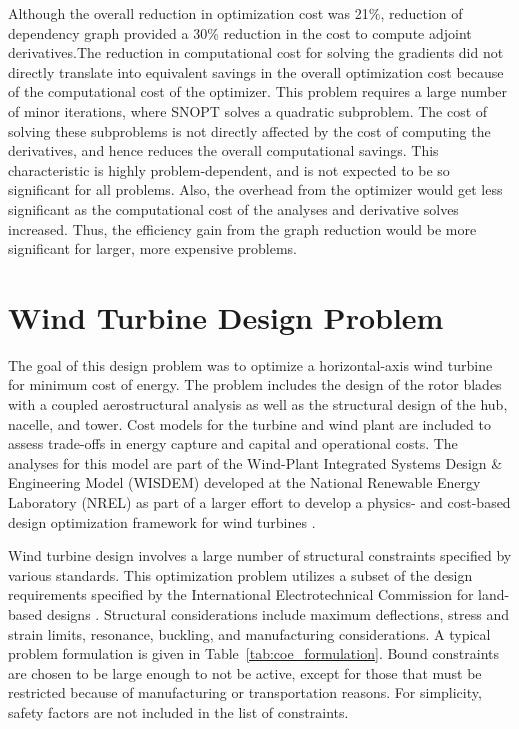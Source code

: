 \documentclass[]{aiaa-tc} %
\begin{document}
            Although the overall reduction in optimization cost was 21\%, reduction of dependency graph provided
            a 30\% reduction in the cost to compute adjoint derivatives.The reduction in computational cost for solving the gradients 
            did not directly translate into equivalent savings in the overall optimization cost because of the computational 
            cost of the optimizer. This problem requires a large number of minor iterations, where SNOPT solves a quadratic subproblem.
            The cost of solving these subproblems is not directly affected by the cost of computing the derivatives, and hence
            reduces the overall computational savings. This characteristic is highly problem-dependent, and is not expected
            to be so significant for all problems. Also, the overhead from the optimizer would get less significant as the
            computational cost of the analyses and derivative solves increased. Thus, the efficiency gain from the graph reduction
            would be more significant for larger, more expensive problems.


  \section{Wind Turbine Design Problem}

    The goal of this design problem was to optimize a horizontal-axis wind turbine for minimum
    cost of energy. The problem includes the design of the rotor blades
    with a coupled aerostructural analysis as well as the structural design of the hub, nacelle,
    and tower. Cost models for the turbine and wind plant are included
    to assess trade-offs in energy capture and capital and operational costs. The analyses
    for this model are part of the Wind-Plant Integrated Systems Design \& Engineering Model (WISDEM)
    developed at the National Renewable Energy Laboratory (NREL) as part of a larger effort
    to develop a physics- and cost-based design optimization framework for wind turbines  \cite{Dykes2014a,Ning2013a,Ning2014,Ning2014d}.

    Wind turbine design involves a large number of structural constraints specified by various standards.  This optimization problem utilizes a subset of the design requirements specified by the International Electrotechnical Commission for land-based designs \cite{IEC}.  Structural considerations include maximum deflections, stress and strain limits, resonance, buckling, and manufacturing considerations.   A typical problem formulation is given in Table~\ref{tab:coe_formulation}.  Bound constraints are chosen to be large enough to not be active, except for those that must be restricted because of manufacturing or transportation reasons.  For simplicity, safety factors are not included in the list of constraints.
\end{document}
